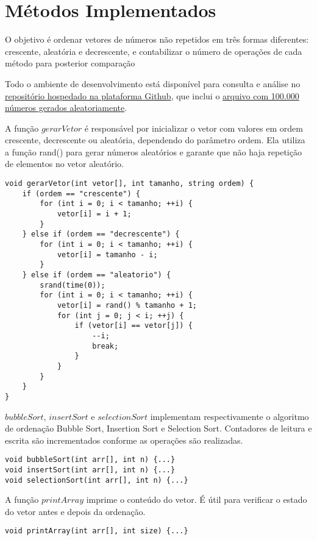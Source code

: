 \section{Métodos Implementados}
O objetivo é ordenar vetores de números não repetidos em três formas diferentes: crescente, aleatória e decrescente, e contabilizar o número de operações de cada método para posterior comparação

Todo o ambiente de desenvolvimento está disponível para consulta e análise no \href{https://github.com/LucasWithBoots/algoritmos_ordenacao_cpp.git}{repositório hospedado na plataforma Github}, que inclui o \href{https://github.com/LucasWithBoots/algoritmos_ordenacao_cpp/blob/master/assets/vetor.txt}{arquivo com 100.000 números gerados aleatoriamente}.

A função $gerarVetor$ é responsável por inicializar o vetor com valores em ordem crescente, decrescente ou aleatória, dependendo do parâmetro ordem. Ela utiliza a função rand() para gerar números aleatórios e garante que não haja repetição de elementos no vetor aleatório.

\begin{verbatim}
void gerarVetor(int vetor[], int tamanho, string ordem) {
    if (ordem == "crescente") {
        for (int i = 0; i < tamanho; ++i) {
            vetor[i] = i + 1;
        }
    } else if (ordem == "decrescente") {
        for (int i = 0; i < tamanho; ++i) {
            vetor[i] = tamanho - i;
        }
    } else if (ordem == "aleatorio") {
        srand(time(0));
        for (int i = 0; i < tamanho; ++i) {
            vetor[i] = rand() % tamanho + 1;
            for (int j = 0; j < i; ++j) {
                if (vetor[i] == vetor[j]) {
                    --i;
                    break;
                }
            }
        }
    }
}
\end{verbatim}

$bubbleSort$, $insertSort$ e $selectionSort$ implementam respectivamente o algoritmo de ordenação Bubble Sort, Insertion Sort e Selection Sort. Contadores de leitura e escrita são incrementados conforme as operações são realizadas.

\begin{verbatim}
void bubbleSort(int arr[], int n) {...}
void insertSort(int arr[], int n) {...}
void selectionSort(int arr[], int n) {...}
\end{verbatim}

A função $printArray$ imprime o conteúdo do vetor. É útil para verificar o estado do vetor antes e depois da ordenação.

\begin{verbatim}
void printArray(int arr[], int size) {...}
\end{verbatim}